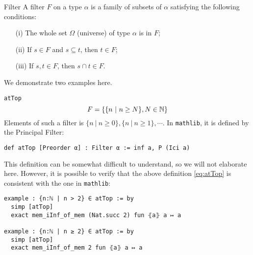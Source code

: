 \documentclass[a4paper]{article}
\begin{document}
\begin{dfn}{Filter}
A filter \(F\) on a type \(\alpha\) is a family of subsets of \(\alpha\) satisfying the following conditions:
\begin{itemize}
    \item[(i)] The whole set \(\Omega\) (universe) of type \(\alpha\) is in \(F\);
    \item[(ii)] If \(s \in F\) and \(s \subseteq t\), then \(t \in F\);
    \item[(iii)] If \(s, t \in F\), then \(s \cap t \in F\).
\end{itemize}
\end{dfn}
We demonstrate two examples here.
\begin{xmp}{\texttt{atTop}}
\begin{equation}
\label{eq:atTop}
    F = \{\{ n ~|~ n \geq N\}, N  \in \operatorname{\mathbb{N}} \}
\end{equation}
Elements of such a filter is $\{ n ~|~ n \geq 0\}, \{ n ~|~ n \geq 1\},\cdots$. In \texttt{mathlib}, it is defined by the Principal Filter:
\begin{lstlisting}[style = lean]
def atTop [Preorder α] : Filter α := inf a, P (Ici a)
\end{lstlisting}
This definition can be somewhat difficult to understand, so we will not elaborate here. However, it is possible to verify that the above definition \eqref{eq:atTop} is consistent with the one in \texttt{mathlib}:
\begin{lstlisting}[style = lean]
example : {n:ℕ | n > 2} ∈ atTop := by
  simp [atTop]
  exact mem_iInf_of_mem (Nat.succ 2) fun ⦃a⦄ a ↦ a

example : {n:ℕ | n ≥ 2} ∈ atTop := by
  simp [atTop]
  exact mem_iInf_of_mem 2 fun ⦃a⦄ a ↦ a
\end{lstlisting}
\end{xmp}
\end{document}
